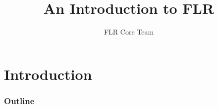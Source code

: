 \documentclass{beamer}%
\title[Introduction to FLCore]{An Introduction to FLR}
\author{FLR Core Team}
\begin{document}



\section{Introduction}

\begin{frame}[plain]
\titlepage
\end{frame}

\begin{frame}
\frametitle{Outline}
\tableofcontents[pausesections]
\end{frame}
\end{document}
